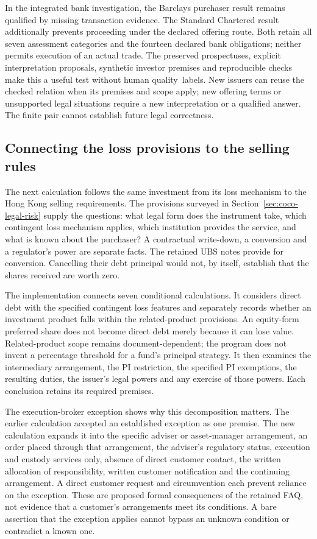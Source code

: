 In the integrated bank investigation, the Barclays purchaser result remains
qualified by missing transaction evidence. The Standard Chartered result
additionally prevents proceeding under the declared offering route. Both retain
all seven assessment categories and the fourteen declared bank obligations;
neither permits execution of an actual trade. The preserved prospectuses,
explicit interpretation proposals, synthetic investor premises and reproducible
checks make this a useful test without human \mbox{quality labels}. New issuers can
reuse the checked relation when its premises and scope apply; new offering
terms or unsupported legal situations require a new interpretation or a
qualified answer. The finite pair cannot establish future legal correctness.

\subsection{Connecting the loss provisions to the selling rules}
\label{sec:joined-eligibility}

The next calculation follows the same investment from its loss mechanism to
the Hong Kong selling requirements. The provisions surveyed in
Section~\ref{sec:coco-legal-risk} supply the questions: what legal form does the
instrument take, which contingent loss mechanism applies, which institution
provides the service, and what is known about the purchaser? A contractual
write-down, a conversion and a regulator's power are separate facts. The
retained UBS notes provide for conversion. Cancelling their debt principal
would not, by itself, establish that the shares received are worth zero.

The implementation connects seven conditional calculations. It considers direct
debt with the specified contingent loss features and separately records whether
an investment product falls within the related-product provisions. An
equity-form preferred share does not become direct debt merely because it can
lose value. Related-product scope remains document-dependent; the program does
not invent a percentage threshold for a fund's principal strategy. It then
examines the intermediary arrangement, the PI restriction, the specified PI
exemptions, the resulting duties, the issuer's legal powers and any exercise of
those powers. Each conclusion retains its required premises.

The execution-broker exception shows why this decomposition matters. The
earlier calculation accepted an established exception as one premise. The new
calculation expands it into the specific adviser or asset-manager arrangement,
an order placed through that arrangement, the adviser's regulatory status,
execution and custody services only, absence of direct customer contact, the
written allocation of responsibility, written customer notification and the
continuing arrangement. A direct customer request and circumvention each
prevent reliance on the exception. These are proposed formal consequences of
the retained FAQ, not evidence that a customer's arrangements meet its
conditions. A bare assertion that the exception applies cannot bypass an
unknown condition or contradict a known one.

